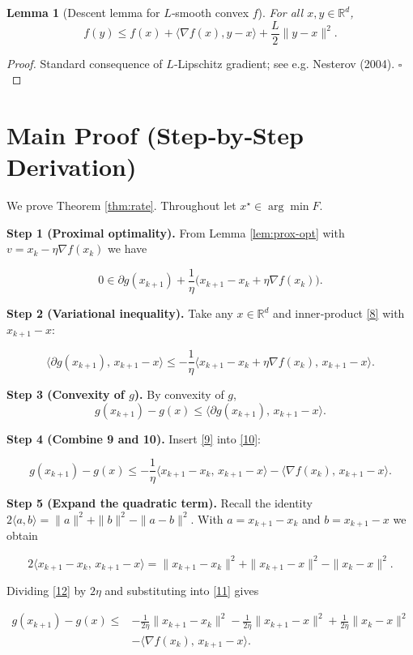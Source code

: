 \documentclass{article}
\newtheorem{lemma}{Lemma}
\newcommand{\R}{\mathbb{R}}
\begin{document}
\begin{lemma}[Descent lemma for $L$‑smooth convex $f$]\label{lem:descent}
For all $x,y\in\R^{d}$,
\[
f(y)\le f(x)+\langle\nabla f(x),y-x\rangle+\frac{L}{2}\|y-x\|^{2}. \tag{7}
\]
\end{lemma}
\begin{proof}
Standard consequence of $L$‑Lipschitz gradient; see e.g. Nesterov (2004). \hfill $\square$
\end{proof}

\section*{Main Proof (Step‑by‑Step Derivation)}
We prove Theorem \ref{thm:rate}. Throughout let $x^{\star}\in\arg\min F$.

\noindent\textbf{Step 1 (Proximal optimality).}  
From Lemma \ref{lem:prox-opt} with $v = x_{k}-\eta\nabla f(x_{k})$ we have  

\[
0\in \partial g(x_{k+1})+\frac1\eta\bigl(x_{k+1}-x_{k}+\eta\nabla f(x_{k})\bigr). \tag{8}
\]

\noindent\textbf{Step 2 (Variational inequality).}  
Take any $x\in\R^{d}$ and inner‑product \eqref{8} with $x_{k+1}-x$:

\[
\big\langle \partial g(x_{k+1}),\,x_{k+1}-x\big\rangle
\le -\frac1\eta\big\langle x_{k+1}-x_{k}+\eta\nabla f(x_{k}),\,x_{k+1}-x\big\rangle. \tag{9}
\]

\noindent\textbf{Step 3 (Convexity of $g$).}  
By convexity of $g$,
\[
g(x_{k+1})-g(x)\le\big\langle \partial g(x_{k+1}),\,x_{k+1}-x\big\rangle. \tag{10}
\]

\noindent\textbf{Step 4 (Combine 9 and 10).}  
Insert \eqref{9} into \eqref{10}:

\[
g(x_{k+1})-g(x)\le -\frac1\eta\big\langle x_{k+1}-x_{k},\,x_{k+1}-x\big\rangle
               -\langle \nabla f(x_{k}),\,x_{k+1}-x\big\rangle. \tag{11}
\]

\noindent\textbf{Step 5 (Expand the quadratic term).}  
Recall the identity $2\langle a,b\rangle=\|a\|^{2}+\|b\|^{2}-\|a-b\|^{2}$. With $a=x_{k+1}-x_{k}$ and $b=x_{k+1}-x$ we obtain  

\[
2\langle x_{k+1}-x_{k},\,x_{k+1}-x\rangle
= \|x_{k+1}-x_{k}\|^{2}+\|x_{k+1}-x\|^{2}-\|x_{k}-x\|^{2}. \tag{12}
\]

Dividing \eqref{12} by $2\eta$ and substituting into \eqref{11} gives  

\[
\begin{aligned}
g(x_{k+1})-g(x)
\le &-\frac{1}{2\eta}\|x_{k+1}-x_{k}\|^{2}
     -\frac{1}{2\eta}\|x_{k+1}-x\|^{2}
     +\frac{1}{2\eta}\|x_{k}-x\|^{2}\\
   &-\langle \nabla f(x_{k}),\,x_{k+1}-x\rangle. \tag{13}
\end{aligned}
\]
\end{document}
